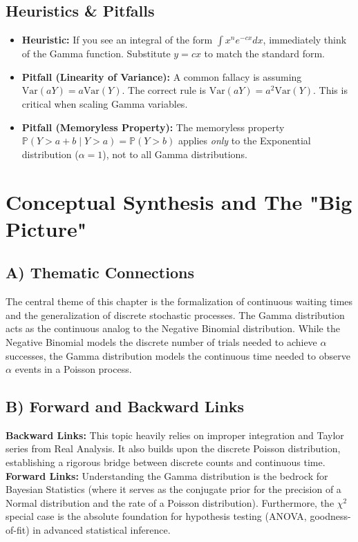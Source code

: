 \documentclass[11pt, a4paper]{article}
\theoremstyle{definition}
\theoremstyle{remark}
\newcommand{\Prob}{\mathbb{P}}
\begin{document}
\subsection{Heuristics \& Pitfalls}
\begin{itemize}
    \item \textbf{Heuristic:} If you see an integral of the form $\int x^n e^{-cx} dx$, immediately think of the Gamma function. Substitute $y = cx$ to match the standard form.
    \item \textbf{Pitfall (Linearity of Variance):} A common fallacy is assuming $\text{Var}(aY) = a\text{Var}(Y)$. The correct rule is $\text{Var}(aY) = a^2\text{Var}(Y)$. This is critical when scaling Gamma variables.
    \item \textbf{Pitfall (Memoryless Property):} The memoryless property $\Prob(Y > a+b \mid Y > a) = \Prob(Y > b)$ applies \textit{only} to the Exponential distribution ($\alpha=1$), not to all Gamma distributions.
\end{itemize}

\section{Conceptual Synthesis and The "Big Picture"}

\subsection{A) Thematic Connections}
The central theme of this chapter is the formalization of continuous waiting times and the generalization of discrete stochastic processes. The Gamma distribution acts as the continuous analog to the Negative Binomial distribution. While the Negative Binomial models the discrete number of trials needed to achieve $\alpha$ successes, the Gamma distribution models the continuous time needed to observe $\alpha$ events in a Poisson process.

\subsection{B) Forward and Backward Links}
\textbf{Backward Links:} This topic heavily relies on improper integration and Taylor series from Real Analysis. It also builds upon the discrete Poisson distribution, establishing a rigorous bridge between discrete counts and continuous time.
\textbf{Forward Links:} Understanding the Gamma distribution is the bedrock for Bayesian Statistics (where it serves as the conjugate prior for the precision of a Normal distribution and the rate of a Poisson distribution). Furthermore, the $\chi^2$ special case is the absolute foundation for hypothesis testing (ANOVA, goodness-of-fit) in advanced statistical inference.
\end{document}
